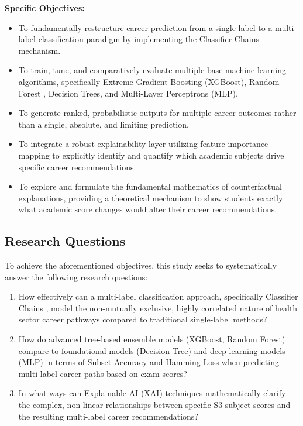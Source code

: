 \textbf{Specific Objectives:}
\begin{itemize}
    \item To fundamentally restructure career prediction from a single-label to a multi-label \parencite{tsoumakas2007multi} classification paradigm by implementing the Classifier Chains \parencite{read2011classifier} mechanism.
    \item To train, tune, and comparatively evaluate multiple base machine learning algorithms, specifically Extreme Gradient Boosting (XGBoost), Random Forest \parencite{breiman2001random}, Decision Trees, and Multi-Layer Perceptrons (MLP).
    \item To generate ranked, probabilistic outputs for multiple career outcomes rather than a single, absolute, and limiting prediction.
    \item To integrate a robust explainability layer utilizing feature importance mapping to explicitly identify and quantify which academic subjects drive specific career recommendations.
    \item To explore and formulate the fundamental mathematics of counterfactual \parencite{wachter2017counterfactual} explanations, providing a theoretical mechanism to show students exactly what academic score changes would alter their career recommendations.
\end{itemize}

\subsection{Research Questions}

To achieve the aforementioned objectives, this study seeks to systematically answer the following research questions:
\begin{enumerate}
    \item How effectively can a multi-label \parencite{tsoumakas2007multi} classification approach, specifically Classifier Chains \parencite{read2011classifier}, model the non-mutually exclusive, highly correlated nature of health sector career pathways compared to traditional single-label methods?
    \item How do advanced tree-based ensemble models (XGBoost, Random Forest) compare to foundational models (Decision Tree) and deep learning models (MLP) in terms of Subset Accuracy and Hamming Loss when predicting multi-label \parencite{tsoumakas2007multi} career paths based on exam scores?
    \item In what ways can Explainable AI (XAI) techniques mathematically clarify the complex, non-linear relationships between specific S3 subject scores and the resulting multi-label \parencite{tsoumakas2007multi} career recommendations?
\end{enumerate}

